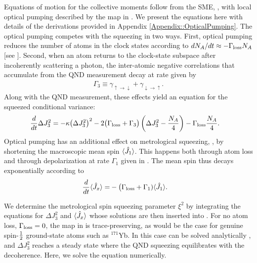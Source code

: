 \documentclass[preprint,aps,pra,onecolumn]{revtex4-1} %
\newcommand{\varz}{\Delta J_3^2}
\newcommand{\jx}{\hat{J}_1}
\newcommand{\gammaud}{\gamma_{\uparrow \rightarrow \downarrow}}
\newcommand{\gammadu}{\gamma_{\downarrow \rightarrow \uparrow}}
\newcommand{\half}{\smallfrac{1}{2}}
\newcommand{\xrate}{\Gamma_{1}}
\newcommand{\lrate}{\Gamma_{\rm loss}}
\newcommand{\zrate}{\Gamma_{3}}
\begin{document}
Equations of motion for the collective moments follow from the SME, , with local optical pumping described by the map in .  We present the equations here with details of the derivations provided in Appendix \ref{Appendix::OpticalPumping}. The optical pumping competes with the squeezing in two ways. First, optical pumping reduces the number of atoms in the clock states according to $dN_A/dt \approx - \lrate N_A$ [see ]. Second, when an atom returns to the clock-state subspace after incoherently scattering a photon, the inter-atomic negative correlations that accumulate from the QND measurement decay at rate given by
	\begin{align}
		\zrate \equiv \gammaud + \gammadu.
	\end{align}
Along with the QND measurement, these effects yield an equation for the squeezed conditional variance:
	\begin{align} \label{Eq::Jzvariance}
		\frac{d}{dt} \varz & = - \kappa \big( \varz \big)^2 - 2 \big( \lrate + \zrate \big) \left( \varz - \frac{N_A}{4} \right) - \lrate \frac{N_A}{4}. 
	\end{align}
Optical pumping has an additional effect on metrological squeezing, , by shortening the macroscopic mean spin $ \expt{\jx}$. This happens both through atom loss and through depolarization at rate $\xrate$ given in . The mean spin thus decays exponentially according to
 	\begin{align}
		\frac{d}{dt} \expt{\hat{J}_x} =& - \big(\lrate + \xrate ) \expt{\jx}.
	\end{align}

We determine the metrological spin squeezing parameter $\xi^2$ by integrating the equations for $\varz$ and $\langle{\hat{J}_x}\rangle$ whose solutions are then inserted into .  For no atom loss, $\lrate = 0$, the map in  is trace-preserving, as would be the case for genuine spin-$\half$ ground-state atoms such as $^{171}$Yb.  In this case  can be solved analytically \cite{baragiola_three-dimensional_2014}, and $\varz$ reaches a steady state where the QND squeezing equilibrates with the decoherence. Here, we solve the equation numerically. 
\end{document}
